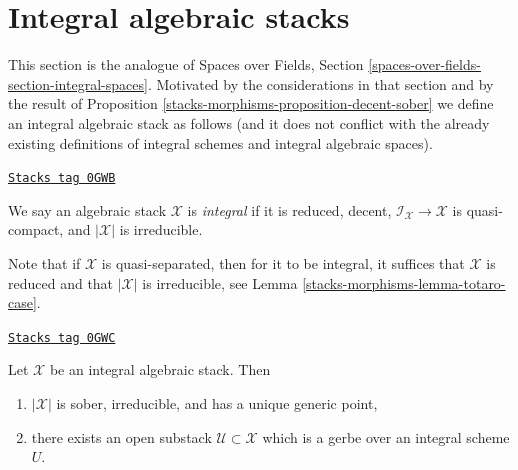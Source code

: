 \section{Integral algebraic stacks}
\label{stacks-morphisms-section-integral-stacks}
This section is the analogue of Spaces over Fields, Section
\ref{spaces-over-fields-section-integral-spaces}.
Motivated by the considerations in that section and by the result
of Proposition \ref{stacks-morphisms-proposition-decent-sober} we define an
integral algebraic stack as follows (and it does not conflict
with the already existing definitions of integral schemes and
integral algebraic spaces).

\begin{definition}
\label{stacks-morphisms-definition-integral-algebraic-stack}
\href{https://stacks.math.columbia.edu/tag/0GWB}{\texttt{Stacks tag 0GWB}}

We say an algebraic stack $\mathcal{X}$ is
{\it integral} if it is reduced, decent,
$\mathcal{I}_\mathcal{X} \to \mathcal{X}$ is quasi-compact,
and $|\mathcal{X}|$ is irreducible.
\end{definition}

Note that if $\mathcal{X}$ is quasi-separated, then
for it to be integral, it suffices that $\mathcal{X}$ is reduced
and that $|\mathcal{X}|$ is irreducible, see Lemma \ref{stacks-morphisms-lemma-totaro-case}.

\begin{lemma}
\label{stacks-morphisms-lemma-structure-integral-stack}
\href{https://stacks.math.columbia.edu/tag/0GWC}{\texttt{Stacks tag 0GWC}}

Let $\mathcal{X}$ be an integral algebraic stack. Then
\begin{enumerate}
\item $|\mathcal{X}|$ is sober, irreducible, and has a unique generic point,
\item there exists an open substack $\mathcal{U} \subset \mathcal{X}$
which is a gerbe over an integral scheme $U$.
\end{enumerate}
\end{lemma}

